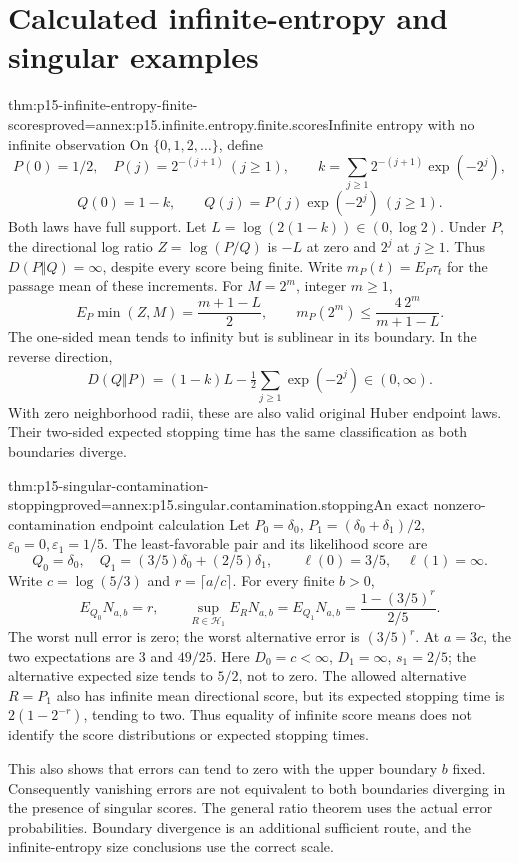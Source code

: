 \section{Calculated infinite-entropy and singular examples}
\label{sec:p15-endpoint-examples}

\begin{hbtheorem}{thm:p15-infinite-entropy-finite-scores}{proved=annex:p15.infinite.entropy.finite.scores}{Infinite entropy with no infinite observation}
On \(\{0,1,2,\ldots\}\), define
\[
 P(0)=1/2,\quad P(j)=2^{-(j+1)}\ (j\geq1),\qquad
 k=\sum_{j\geq1}2^{-(j+1)}\exp(-2^j),
\]
\[
 Q(0)=1-k,\qquad Q(j)=P(j)\exp(-2^j)\ (j\geq1).
\]
Both laws have full support. Let \(L=\log(2(1-k))\in(0,\log2)\).
Under \(P\), the directional log ratio \(Z=\log(P/Q)\) is
\(-L\) at zero and \(2^j\) at \(j\geq1\). Thus
\(D(P\Vert Q)=\infty\), despite every score being finite.
Write \(m_P(t)=E_P\tau_t\) for the passage mean of these increments.
For \(M=2^m\), integer \(m\geq1\),
\[
 E_P\min(Z,M)=\frac{m+1-L}{2},\qquad
 m_P(2^m)\leq\frac{4\,2^m}{m+1-L}.
\]
The one-sided mean tends to infinity but is sublinear in its boundary.
In the reverse direction,
\[
 D(Q\Vert P)=(1-k)L-\tfrac12\sum_{j\geq1}\exp(-2^j)
                       \in(0,\infty).
\]
With zero neighborhood radii, these are also valid original Huber
endpoint laws. Their two-sided expected stopping time has the
same classification as both boundaries diverge.
\end{hbtheorem}

\begin{hbtheorem}{thm:p15-singular-contamination-stopping}{proved=annex:p15.singular.contamination.stopping}{An exact nonzero-contamination endpoint calculation}
Let \(P_0=\delta_0\), \(P_1=(\delta_0+\delta_1)/2\),
\(\varepsilon_0=0,\varepsilon_1=1/5\).
The least-favorable pair and its likelihood score are
\[
 Q_0=\delta_0,\quad Q_1=(3/5)\delta_0+(2/5)\delta_1,\qquad
 \ell(0)=3/5,\quad\ell(1)=\infty.
\]
Write \(c=\log(5/3)\) and \(r=\lceil a/c\rceil\).
For every finite \(b>0\),
\[
 E_{Q_0}N_{a,b}=r,\qquad
 \sup_{R\in\mathcal H_1}E_RN_{a,b}
 =E_{Q_1}N_{a,b}=\frac{1-(3/5)^r}{2/5}.
\]
The worst null error is zero; the worst alternative error is \((3/5)^r\).
At \(a=3c\), the two expectations are \(3\) and \(49/25\).
Here \(D_0=c<\infty\), \(D_1=\infty\), \(s_1=2/5\);
the alternative expected size tends to \(5/2\), not to zero.
The allowed alternative \(R=P_1\) also has infinite mean directional
score, but its expected stopping time is \(2(1-2^{-r})\), tending to
two. Thus equality of infinite score means does not identify the
score distributions or expected stopping times.

This also shows that errors can tend to zero with the upper boundary
\(b\) fixed. Consequently vanishing errors are not equivalent to
both boundaries diverging in the presence of singular scores.
The general ratio theorem uses the actual error probabilities.
Boundary divergence is an additional sufficient route, and the
infinite-entropy size conclusions use the correct scale.
\end{hbtheorem}

